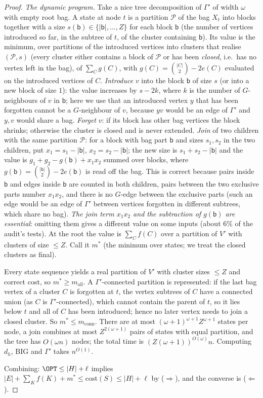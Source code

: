 \begin{proof}
\emph{The dynamic program.} Take a nice tree decomposition of $\Gamma'$ of width $\omega$ with empty root bag. A state at node $t$ is a partition $\mathcal P$ of the bag $X_t$ into blocks together with a size $s(\mathsf b)\in\{|\mathsf b|,\dots,Z\}$ for each block $\mathsf b$ (the number of vertices introduced so far, in the subtree of $t$, of the cluster containing $\mathsf b$). Its value is the minimum, over partitions of the introduced vertices into clusters that realise $(\mathcal P,s)$ (every cluster either contains a block of $\mathcal P$ or has been \emph{closed}, i.e.\ has no vertex left in the bag), of $\sum_C g(C)$, with $g(C)=\binom{|C|}2-2e(C)$ evaluated on the introduced vertices of $C$. \emph{Introduce} $v$ into the block $\mathsf b$ of size $s$ (or into a new block of size $1$): the value increases by $s-2k$, where $k$ is the number of $G$-neighbours of $v$ in $\mathsf b$; here we use that an introduced vertex $y$ that has been forgotten cannot be a $G$-neighbour of $v$, because $yv$ would be an edge of $\Gamma'$ and $y,v$ would share a bag. \emph{Forget} $v$: if its block has other bag vertices the block shrinks; otherwise the cluster is closed and is never extended. \emph{Join} of two children with the same partition $\mathcal P$: for a block with bag part $\mathsf b$ and sizes $s_1,s_2$ in the two children, put $x_1=s_1-|\mathsf b|$, $x_2=s_2-|\mathsf b|$; the new size is $s_1+s_2-|\mathsf b|$ and the value is $g_1+g_2-g(\mathsf b)+x_1x_2$ summed over blocks, where $g(\mathsf b)=\binom{|\mathsf b|}2-2e(\mathsf b)$ is read off the bag. This is correct because pairs inside $\mathsf b$ and edges inside $\mathsf b$ are counted in both children, pairs between the two exclusive parts number $x_1x_2$, and there is no $G$-edge between the exclusive parts (such an edge would be an edge of $\Gamma'$ between vertices forgotten in different subtrees, which share no bag). \emph{The join term $x_1x_2$ and the subtraction of $g(\mathsf b)$ are essential}: omitting them gives a different value on some inputs (about $6\%$ of the audit's tests). At the root the value is $\sum_Cf(C)$ over a partition of $V'$ with clusters of size $\le Z$. Call it $m^*$ (the minimum over states; we treat the closed clusters as final).

Every state sequence yields a real partition of $V'$ with cluster sizes $\le Z$ and correct cost, so $m^*\ge m_{\mathrm{all}}$. A $\Gamma'$-connected partition is represented: if the last bag vertex of a cluster $C$ is forgotten at $t$, the vertex subtrees of $C$ have a connected union (as $C$ is $\Gamma'$-connected), which cannot contain the parent of $t$, so it lies below $t$ and all of $C$ has been introduced; hence no later vertex needs to join a closed cluster. So $m^*\le m_{\mathrm{conn}}$. There are at most $(\omega+1)^{\omega+1}Z^{\omega+1}$ states per node, a join combines at most $Z^{2(\omega+1)}$ pairs of states with equal partition, and the tree has $O(\omega n)$ nodes; the total time is $(Z(\omega+1))^{O(\omega)}n$. Computing $d_h$, $\mathrm{BIG}$ and $\Gamma'$ takes $n^{O(1)}$.

Combining: $\OPT\le|H|+\ell$ implies $|E|+\sum_Kf(K)+m^*\le\mathrm{cost}(S)\le|H|+\ell$ by ($\Rightarrow$), and the converse is ($\Leftarrow$).
\end{proof}
